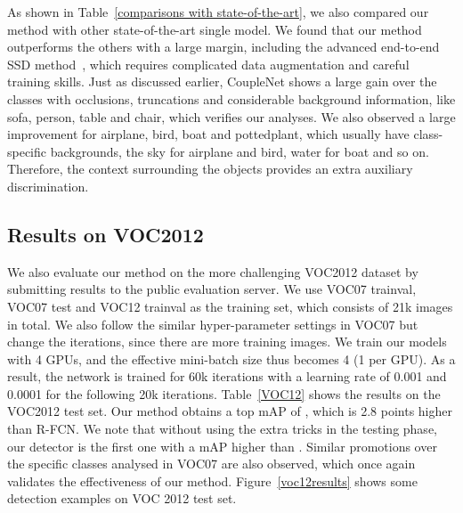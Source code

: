 \documentclass[10pt,twocolumn,letterpaper]{article}
\begin{document}
As shown in Table~\ref{comparisons with state-of-the-art}, we also compared our method with other state-of-the-art single model. We found that our method outperforms the others with a large margin, including the advanced end-to-end SSD method~\cite{liu2016ssd}, which requires complicated data augmentation and careful training skills. Just as discussed earlier, CoupleNet shows a large gain over the classes with occlusions, truncations and considerable background information, like sofa, person, table and chair, which verifies our analyses. We also observed a large improvement for airplane, bird, boat and pottedplant, which usually have class-specific backgrounds, \ie the sky for airplane and bird, water for boat and so on. Therefore, the context surrounding the objects provides an extra auxiliary discrimination.

\subsection{Results on VOC2012}
We also evaluate our method on the more challenging VOC2012 dataset by submitting results to the public evaluation server. We use VOC07 trainval, VOC07 test and VOC12 trainval as the training set, which consists of 21k images in total. We also follow the similar hyper-parameter settings in VOC07 but change the iterations, since there are more training images. We train our models with 4 GPUs, and the effective mini-batch size thus becomes 4 (1 per GPU). As a result, the network is trained for 60k iterations with a learning rate of 0.001 and 0.0001 for the following 20k iterations. Table~\ref{VOC12} shows the results on the VOC2012 test set. Our method obtains a top mAP of , which is 2.8 points higher than R-FCN. We note that without using the extra tricks in the testing phase, our detector is the first one with a mAP higher than . Similar promotions over the specific classes analysed in VOC07 are also observed, which once again validates the effectiveness of our method. Figure~\ref{voc12results} shows some detection examples on VOC 2012 test set.
\end{document}

